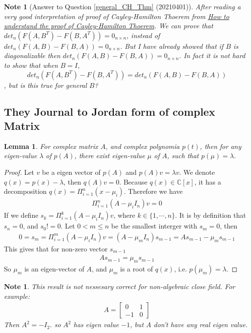 \documentclass[pdf]{article}
\newtheorem{lemma}[theorem]{Lemma}
\newtheorem{note}[theorem]{Note}
\begin{document}
\begin{note}[Answer to Question \ref{general_CH_Thm} (20210401)]
After reading a very good interpretation of proof of Cayley-Hamilton Thoerem from \href{https://www.zhihu.com/question/57468352/answer/153402620}{How to understand the proof of Cayley-Hamilton Thoerem}. We can prove that $det_n(F(A,B^T) - F(B,A^T)) = 0_{n\times n}$, instead of $det_n(F(A,B) - F(B,A)) = 0_{n\times n}$. But I have already showed that if $B$ is diagonalizable then $det_n(F(A,B) - F(B,A)) = 0_{n\times n}$. In fact it is not hard to show that when $B=I$, $$det_n(F(A,B^T) - F(B,A^T)) = det_n(F(A,B) - F(B,A))$$, but is this true for general $B$?
\end{note}

\subsection{They Journal to Jordan form of complex Matrix}\label{Eigen-Value}

\begin{lemma}
For complex matrix $A$, and complex polynomia $p(t)$, then for any eigen-value $\lambda$ of $p(A)$, there exist eigen-value $\mu$ of $A$, such that $p(\mu) = \lambda$.
\end{lemma}
\begin{proof}
	Let $v$ be a eigen vector of $p(A)$ and $p(A)v = \lambda v$. We denote $q(x) = p(x) - \lambda$, then $q(A)v = 0$. Because $q(x) \in \mathbb{C}[x]$, it has a decomposition $q(x) = \Pi_{i=1}^n(x-\mu_i)$. Therefore we have
		\begin{align*}
		\Pi_{i=1}^n(A-\mu_i I_n)v = 0
		\end{align*}
	If we define $s_k = \Pi_{i=1}^k(A-\mu_i I_n)v$, where $k\in\{1, \cdots, n\}$. It is by definition that $s_n = 0$, and $s_0 != 0$. Let $0<m\leq n$ be the smallest interger with $s_m = 0$, then 
		\begin{align*}
		0= s_m = \Pi_{i=1}^m(A-\mu_i I_n)v = (A-\mu_m I_n)s_{m-1} = As_{m-1} - \mu_ms_{m-1}
		\end{align*}
	This gives that for non-zero vector $s_{m-1}$
		\begin{align*}
		As_{m-1} = \mu_ms_{m-1}
		\end{align*}
	So $\mu_m$ is an eigen-vector of $A$, and $\mu_m$ is a root of $q(x)$, i.e. $p(\mu_m) = \lambda$.
\end{proof}

\begin{note}
This result is not nessesary correct for non-algebraic close field. For example:
\begin{align*}
A = \begin{bmatrix}
0 & 1\\
-1 & 0
\end{bmatrix}
\end{align*}
Then $A^2 = -I_2$. so $A^2$ has eigen value $-1$, but $A$ don't have any real eigen value.
\end{note}
\end{document}
